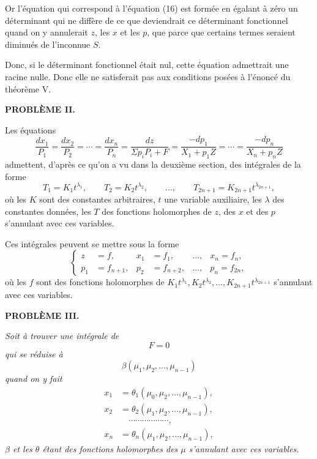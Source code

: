 \documentclass[11pt]{article}
\begin{document}
Or l’équation qui correspond à l’équation (16) est formée en égalant à zéro un déterminant qui ne diffère de ce que deviendrait ce déterminant fonctionnel quand on y annulerait $z$, les $x$ et les $p$, que parce que certains termes seraient diminués de l’inconnue $S$.

Donc, si le déterminant fonctionnel était nul, cette équation admettrait une racine nulle. Donc elle ne satisferait pas aux conditions posées à l’énoncé du théorème V.

\begin{center}
{\bfseries PROBLÈME II.}
\end{center}

Les équations
\[
\frac{dx_1}{P_1}=\frac{dx_2}{P_2}=\cdots=\frac{dx_n}{P_n}
=\frac{dz}{\Sigma p_iP_i+F}
=\frac{-dp_1}{X_1+p_1Z}=\cdots=\frac{-dp_n}{X_n+p_nZ}
\]
admettent, d’après ce qu’on a vu dans la deuxième section, des intégrales de la forme
\begin{equation*}\tag{34}
T_1=K_1t^{\lambda_1},\qquad T_2=K_2t^{\lambda_2},\qquad \ldots,\qquad T_{2n+1}=K_{2n+1}t^{\lambda_{2n+1}},
\end{equation*}
où les $K$ sont des constantes arbitraires, $t$ une variable auxiliaire, les $\lambda$ des constantes données, les $T$ des fonctions holomorphes de $z$, des $x$ et des $p$ s’annulant avec ces variables.

Ces intégrales peuvent se mettre sous la forme
\begin{equation*}\tag{35}
\left\{
\begin{aligned}
z&=f,& x_1&=f_1,& \ldots,& x_n=f_n,\\
p_1&=f_{n+1},& p_2&=f_{n+2},& \ldots,& p_n=f_{2n},
\end{aligned}
\right.
\end{equation*}
où les $f$ sont des fonctions holomorphes de $K_1t^{\lambda_1},K_2t^{\lambda_2},\ldots,K_{2n+1}t^{\lambda_{2n+1}}$ s’annulant avec ces variables.

\begin{center}
{\bfseries PROBLÈME III.}
\end{center}

\emph{Soit à trouver une intégrale de}
\[
F=0
\]
\emph{qui se réduise à}
\[
\beta(\mu_1,\mu_2,\ldots,\mu_{n-1})
\]
\emph{quand on y fait}
\[
\begin{aligned}
x_1&=\theta_1(\mu_0,\mu_2,\ldots,\mu_{n-1}),\\
x_2&=\theta_2(\mu_1,\mu_2,\ldots,\mu_{n-1}),\\
&\hspace{1em}\cdots\cdots\cdots\cdots\cdots\cdots,\\
x_n&=\theta_n(\mu_1,\mu_2,\ldots,\mu_{n-1}),
\end{aligned}
\]
\emph{$\beta$ et les $\theta$ étant des fonctions holomorphes des $\mu$ s’annulant avec ces variables.}
\end{document}
